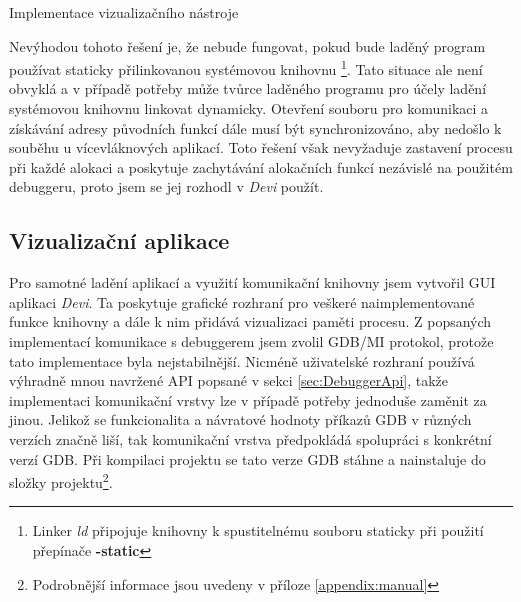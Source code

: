 \documentclass[czech,bachelor,male,python,dept460]{diploma}						%
\newcommand{\parspace}[1][]{
	\ifthenelse{\isempty{#1}}{\vspace{5mm}}{\vspace{#1}}
	\par
}
\begin{document}
\begin{section}{Implementace vizualizačního nástroje}
				\parspace Nevýhodou tohoto řešení je, že nebude fungovat, pokud bude laděný program používat staticky přilinkovanou systémovou knihovnu
				\footnote{Linker \textit{ld} připojuje knihovny k spustitelnému souboru staticky při použití přepínače \textbf{-static}}.
				Tato situace ale není obvyklá a v případě potřeby může tvůrce laděného programu pro účely ladění systémovou knihovnu linkovat dynamicky.
				Otevření souboru pro komunikaci a získávání adresy původních funkcí dále musí být synchronizováno, aby nedošlo k souběhu u vícevláknových aplikací.
				Toto řešení však nevyžaduje zastavení procesu při každé alokaci a poskytuje zachytávání alokačních funkcí nezávislé na použitém debuggeru, proto
				jsem se jej rozhodl v \textit{Devi} použít.
				
			
	\subsection{Vizualizační aplikace}
	Pro samotné ladění aplikací a využití komunikační knihovny jsem vytvořil GUI aplikaci \textit{Devi}.
	Ta poskytuje grafické rozhraní pro veškeré naimplementované funkce knihovny a dále k nim přidává vizualizaci paměti procesu.
	Z popsaných implementací komunikace s debuggerem jsem zvolil GDB/MI protokol, protože tato implementace byla nejstabilnější.
	Nicméně uživatelské rozhraní používá výhradně mnou navržené API popsané v sekci \ref{sec:DebuggerApi}, takže implementaci komunikační vrstvy
	lze v případě potřeby jednoduše zaměnit za jinou. Jelikož se funkcionalita a návratové hodnoty příkazů GDB v různých verzích značně liší, tak komunikační vrstva
	předpokládá spolupráci s konkrétní verzí GDB. Při kompilaci projektu se tato verze GDB stáhne a nainstaluje do složky
	projektu\footnote{Podrobnější informace jsou uvedeny v příloze \ref{appendix:manual}}.
	
	

\end{section}
\end{document}
